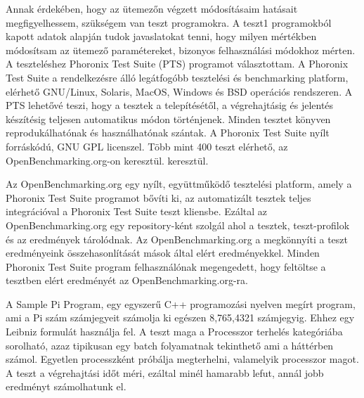 

Annak érdekében, hogy az ütemezőn végzett módosításaim hatásait megfigyelhessem, szükségem van teszt programokra. A teszt1 programokból kapott adatok alapján tudok javaslatokat tenni, hogy milyen mértékben módosítsam az ütemező paramétereket, bizonyos felhasználási módokhoz mérten.
A teszteléshez Phoronix Test Suite (PTS) programot választottam.
A Phoronix Test Suite a rendelkezésre álló legátfogóbb tesztelési és benchmarking platform, elérhető GNU/Linux, Solaris, MacOS, Windows és BSD operációs rendszeren.
A PTS lehetővé teszi, hogy a tesztek a telepítésétől, a végrehajtásig és jelentés készítésig teljesen automatikus módon történjenek.
Minden tesztet könyven reprodukálhatónak és használhatónak szántak.
A Phoronix Test Suite nyílt forráskódú, GNU GPL licenszel.
Több mint 400 teszt elérhető, az OpenBenchmarking.org-on keresztül. keresztül.



Az OpenBenchmarking.org egy nyílt, együttműködő tesztelési platform, amely a Phoronix Test Suite programot bővíti ki, az automatizált tesztek teljes integrációval a Phoronix Test Suite teszt kliensbe.
Ezáltal az OpenBenchmarking.org egy repository-ként szolgál ahol a tesztek, teszt-profilok és az eredmények tárolódnak.
Az OpenBenchmarking.org a megkönnyíti a teszt eredményeink összehasonlítását mások által elért eredményekkel.
Minden Phoronix Test Suite program felhasználónak megengedett, hogy feltöltse a tesztben elért eredményét az OpenBenchmarking.org-ra.



A  Sample Pi Program, egy egyszerű C++ programozási nyelven megírt program, ami a Pi szám számjegyeit számolja ki egészen 8,765,4321 számjegyig. Ehhez egy Leibniz formulát használja fel. A teszt maga a Processzor terhelés kategóriába sorolható, azaz tipikusan egy batch folyamatnak tekinthető ami a háttérben számol. Egyetlen processzként próbálja megterhelni, valamelyik processzor magot. 
A teszt a végrehajtási időt méri, ezáltal minél hamarabb lefut, annál jobb eredményt számolhatunk el.


